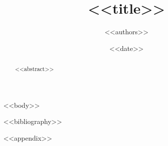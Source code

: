 \documentclass[11pt]{article}
\title{<<title>>}
\author{<<authors>>}
\date{<<date>>}
\begin{document}
\maketitle

\begin{abstract}
<<abstract>>
\end{abstract}

<<body>>

<<bibliography>>

\appendix
<<appendix>>
\end{document}
